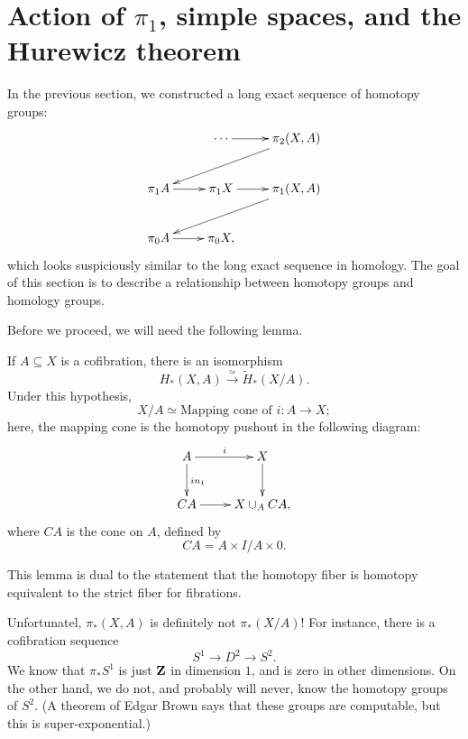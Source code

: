 \section{Action of $\pi_1$, simple spaces, and the Hurewicz theorem}
In the previous section, we constructed a long exact sequence of homotopy groups:
\begin{equation*}
    \xymatrix{
	& \cdots\ar[r] & \pi_2 (X,A)\ar[dll]\\
	\pi_1 A\ar[r] & \pi_1 X\ar[r] & \pi_1 (X,A)\ar[dll]\\
	\pi_0 A\ar[r] & \pi_0 X, & 
    }
\end{equation*}
which looks suspiciously similar to the long exact sequence in homology.
The goal of this section is to describe a relationship between homotopy groups and homology groups.

Before we proceed, we will need the following lemma.
\begin{lemma}[Excision]
    If $A\subseteq X$ is a cofibration, there is an isomorphism
    $$H_\ast(X,A)\xrightarrow{\simeq}\widetilde{H}_\ast(X/A).$$
    Under this hypothesis,
    $$X/A\simeq\text{Mapping cone of }i:A\to X;$$
    here, the mapping cone is the homotopy pushout in the following diagram:
    \begin{equation*}
	\xymatrix{
	    A\ar[r]^i\ar[d]^{in_1} & X\ar[d]\\
	    CA\ar[r] & X\cup_A CA,
	    }
    \end{equation*}
    where $CA$ is the cone on $A$, defined by
    $$CA = A\times I/A\times 0.$$
\end{lemma}
This lemma is dual to the statement that the homotopy fiber is homotopy equivalent to the strict fiber for fibrations.

Unfortunatel, $\pi_\ast(X,A)$ is definitely not $\pi_\ast(X/A)$!
For instance, there is a cofibration sequence
$$S^1\to D^2\to S^2.$$
We know that $\pi_\ast S^1$ is just $\mathbf Z$ in dimension $1$, and is zero in other dimensions.
On the other hand, we do not, and probably will never, know the homotopy groups of $S^2$.
(A theorem of Edgar Brown  says that these groups are computable, but this is super-exponential.)

